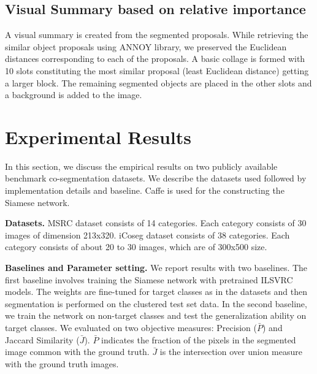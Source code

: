 \documentclass[conference]{IEEEtran}
\begin{document}
\subsection{Visual Summary based on relative importance}
A visual summary is created from the segmented proposals. While retrieving the similar object proposals using ANNOY library, we preserved the Euclidean distances corresponding to each of the proposals. A basic collage is formed with 10 slots constituting the most similar proposal (least Euclidean distance) getting a larger block. The remaining segmented objects are placed in the other slots and a background is added to the image.
\section{Experimental Results}
\label{sec:results}
In this section, we discuss the empirical results on two publicly available benchmark co-segmentation datasets. We describe the datasets used followed by implementation details and baseline. Caffe \cite{jia2014caffe} is used for the constructing the Siamese network.

\textbf{Datasets.} MSRC dataset \cite{shotton2006textonboost} consists of 14 categories. Each category consists of 30 images of dimension 213x320. iCoseg dataset \cite{batra2010icoseg} consists of 38 categories. Each category consists of about 20 to 30 images, which are of 300x500 size.

\textbf{Baselines and Parameter setting.} We report results with two baselines. The first baseline involves training the Siamese network with pretrained ILSVRC \cite{russakovsky2015imagenet} models. The weights are fine-tuned for target classes as in the datasets and then segmentation is performed on the clustered test set data. In the second baseline, we train the network on non-target classes and test the generalization ability on target classes. We evaluated on two objective measures: Precision ($\bar{\textit{P}}$) and Jaccard Similarity ($\bar{\textit{J}}$). $\bar{\textit{P}}$ indicates the fraction of the pixels in the segmented image common with the ground truth. $\bar{\textit{J}}$ is the intersection over union measure with the ground truth images.    
\begin{figure}[hbtp]
\end{figure}
\end{document}
